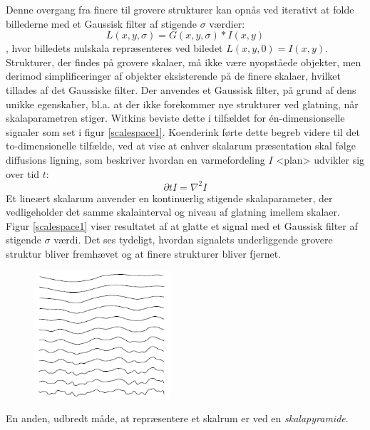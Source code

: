 Denne overgang fra finere til grovere strukturer kan opnås ved iterativt at folde billederne med et Gaussisk filter af stigende $\sigma$ værdier:
\begin{equation}
L(x,y,\sigma) = G(x,y,\sigma)\ast I(x,y)
\label{scalespace1}
\end{equation}
, hvor billedets nulskala repræsenteres ved biledet $ L(x,y,0) = I(x,y)$. \\
Strukturer, der findes på grovere skalaer, må ikke være nyopståede objekter, men derimod simplificeringer af objekter eksisterende på de finere skalaer, hvilket tillades af det Gaussiske filter. Der anvendes et Gaussisk filter, på grund af dens unikke egenskaber,  bl.a. at der ikke forekommer nye strukturer ved glatning, når skalaparametren stiger. Witkins \cite{witkins} beviste dette i tilfældet for én-dimensionselle signaler som set i figur \ref{scalespace1}. Koenderink førte dette begreb videre til det to-dimensionelle tilfælde, ved at vise at enhver skalarum præsentation skal følge diffusions ligning, som beskriver hvordan en varmefordeling $I$ <plan> udvikler sig over tid $t$:
$$ \partial t I = \nabla^2I $$
Et lineært skalarum anvender en kontinuerlig stigende skalaparameter, der vedligeholder det samme skalainterval og niveau af glatning imellem skalaer.
Figur \ref{scalespace1} viser resultatet af at glatte et signal med et Gaussisk filter af stigende $\sigma$ værdi. Det ses tydeligt, hvordan signalets underliggende grovere struktur bliver fremhævet og at finere strukturer bliver fjernet.
\begin{figure}[H]
    \centering
    \includegraphics[width=0.45\textwidth]{fig/33.png}
     \vspace{-1em}
    \begin{center}    
       \caption{\textcolor{gray}{\footnotesize \textit{ }}}
    \label{fig:scalereps}
     \end{center}
     \vspace{-2.5em}
  \end{figure} \noindent
En anden, udbredt måde, at repræsentere et skalrum er ved en \textit{skalapyramide}.  